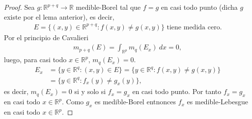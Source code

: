 \begin{proof}
    Sea $g: \mathbb{R}^{p+q} \longrightarrow \mathbb{R}$ medible-Borel tal que $f=g$ en casi todo punto (dicha $g$ existe por el lema anterior), es decir,
    \begin{align*}
        E = \{ (x,y) \in \mathbb{R}^{p+q} : f(x,y) \not = g(x,y) \} \text{ tiene medida cero}.
    \end{align*}
    Por el principio de Cavalieri
    \begin{align*}
        m_{p+q}(E) = \int_{\mathbb{R}^p}{m_q(E_x) \ dx} = 0,
    \end{align*}
    luego, para casi todo $x \in \mathbb{R}^p$, $m_q(E_x) = 0$.
    \begin{align*}
        E_x & = \{ y \in \mathbb{R}^q : (x,y) \in E \} = \{ y \in \mathbb{R}^q : f(x,y) \not = g(x,y) \} \\
            & = \{ y \in \mathbb{R}^q : f_x(y) \not = g_x(y) \},
    \end{align*}
    es decir, $m_q(E_x) = 0$ si y solo si $f_x = g_x$ en casi todo punto. Por tanto $f_x = g_x$ en casi todo $x \in \mathbb{R}^p$. Como $g_x$ es medible-Borel entnonces $f_x$ es medible-Lebesgue en casi todo $x \in \mathbb{R}^p$.
\end{proof}

